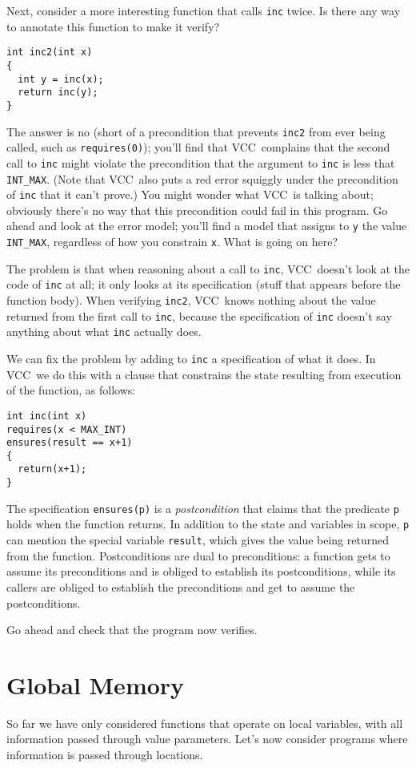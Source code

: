 \documentclass{report}
\newcommand{\Q}[1]{\lstinline~#1~}
\newcommand{\VCC}{VCC}
\newcommand{\Def}[1]{\emph{#1}}
\begin{document}
Next, consider a more interesting function that calls \Q{inc}
twice. Is there any way to annotate this function to make it verify?
\begin{lstlisting}
int inc2(int x)
{
  int y = inc(x);
  return inc(y);
}
\end{lstlisting}
The answer is no (short of a precondition that prevents \Q{inc2} from
ever being called, such as \Q{requires(0)}); you'll find that
\VCC\ complains that the second call to \Q{inc} might violate the
precondition that the argument to \Q{inc} is less that
\Q{INT_MAX}. (Note that \VCC\ also puts a red error squiggly under the
precondition of \Q{inc} that it can't prove.) You might wonder what
\VCC\ is talking about; obviously there's no way that this
precondition could fail in this program. Go ahead and look at the
error model; you'll find a model that assigns to \Q{y} the value
\Q{INT_MAX}, regardless of how you constrain \Q{x}. What is going on
here?

The problem is that when reasoning about a call to \Q{inc},
\VCC\ doesn't look at the code of \Q{inc} at all; it only looks at its
specification (stuff that appears before the function body). When
verifying \Q{inc2}, \VCC\ knows nothing about the value returned from
the first call to \Q{inc}, because the specification of \Q{inc}
doesn't say anything about what \Q{inc} actually does.

We can fix the problem by adding to \Q{inc} a specification of what it
does. In \VCC\ we do this with a clause that constrains the state
resulting from execution of the function, as follows:
\begin{lstlisting}
int inc(int x)
requires(x < MAX_INT)
ensures(result == x+1)
{
  return(x+1);
}
\end{lstlisting}
The specification \Q{ensures(p)} is a \Def{postcondition} that claims
that the predicate \Q{p} holds when the function returns. In addition
to the state and variables in scope, \Q{p} can mention the special
variable \Q{result}, which gives the value being returned from the
function. 
Postconditions are dual to preconditions: a function gets to
assume its preconditions and is obliged to establish its
postconditions, while its callers are obliged to establish the
preconditions and get to assume the postconditions. 

Go ahead and check that the program now verifies.

\section{Global Memory}
So far we have only considered functions that operate on local variables,
with all information passed through value parameters. Let's now
consider programs where information is passed through locations.
\end{document}
